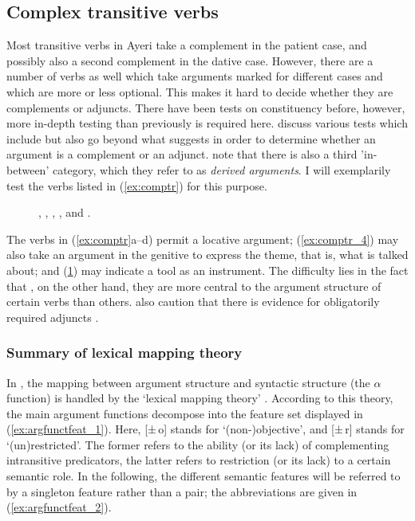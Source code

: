 \subsection{Complex transitive verbs}
\label{subsec:comptr}

Most transitive verbs in Ayeri take a complement in the patient case, and
possibly also a second complement in the dative case. However, there are a
number of verbs as well which take arguments marked for different cases and
which are more or less optional. This makes it hard to decide whether they are
complements or adjuncts. There have been tests on constituency before, however,
more in-depth testing than previously is required here.
\citet{needhamtoivonen2011} discuss various tests which include but also go
beyond what \citet{carnie2013} suggests in order to determine whether an
argument is a complement or an adjunct. \citet{needhamtoivonen2011} note that
there is also a third 'in-between' category, which they refer to as
\emph{derived arguments}. I will exemplarily test the verbs listed in
(\ref{ex:comptr}) for this purpose.

\begin{figure}[h]
\pex\label{ex:comptr}
\a\label{ex:comptr_1}%
	,
\a\label{ex:comptr_2}%
		,
\a\label{ex:comptr_3}%
	,
\a\label{ex:comptr_4}%
	, and
\a\label{ex:comptr_5}%
	.
\xe
\end{figure}

The verbs in (\ref{ex:comptr}a--d) permit a locative argument;
(\ref{ex:comptr_4}) may also take an argument in the genitive to express the
theme, that is, what is talked about; and (\ref{ex:comptr_5}) may indicate a
tool as an instrument. The difficulty lies in the fact that , on the
other hand, they are more central to the argument structure of certain verbs
than others. \citet{needhamtoivonen2011} also caution that there is evidence
for obligatorily required adjuncts \citep[406]{needhamtoivonen2011}.

\subsubsection{Summary of lexical mapping theory}

In \Lfg{}, the mapping between argument structure and syntactic structure (the
$\alpha$ function) is handled by the `lexical mapping theory'
\citep[324--348]{bresnan2016}. According to this theory, the main argument
functions decompose into the feature set displayed in
(\ref{ex:argfunctfeat_1}). Here, [±\,o] stands for `(non-)objective', and
[±\,r] stands for `(un)restricted'. The former refers to the ability (or its
lack) of complementing intransitive predicators, the latter refers to
restriction (or its lack) to a certain semantic role. In the following, the
different semantic features will be referred to by a singleton feature rather
than a pair; the abbreviations are given in (\ref{ex:argfunctfeat_2}).

